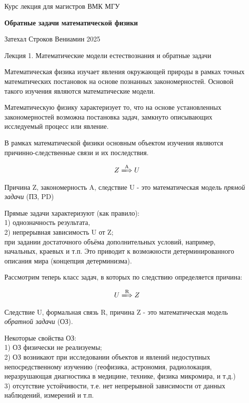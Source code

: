 \documentclass{article}
\begin{document}
\centerline{\large Курс лекция для магистров ВМК МГУ}
\centerline {\textbf{\LARGE Обратные задачи математической физики}}
\centerline {Затехал Строков Вениамин 2025}

\vspace{0.4cm}

\centerline{\LARGE Лекция 1. Математические модели естествознания и обратные задачи}

\vspace{0.5cm}

Математическая физика изучает явления окружающей природы в рамках точных математических постановок на основе познанных закономерностей.
Основой такого изучения являются математические модели.

Математическую физику характеризует то, что на основе установленных закономерностей возможна постановка задач, замкнуто описывающих исследуемый процесс или явление.

В рамках математической физики основным объектом изучения являются причинно-следственные связи и их последствия.

$$ Z \xLongrightarrow{\text{A}} U $$

Причина Z, закономерность A, следствие U - это математическая модель \textit{прямой задачи} (ПЗ, PD)

Прямые задачи характеризуют (как правило):\\
1) однозначность результата,\\
2) непрерывная зависимость U от Z;\\
при задании достаточного объёма дополнительных условий, например, начальных, краевых и т.п. Это приводит к возможности детерминированного описания мира (концепция детерминизма).

\bigskip

Рассмотрим теперь класс задач, в которых по следствию определяется причина:

$$ U \xLongrightarrow{\text{R}} Z $$

Следствие U, формальная связь R, причина Z - это математическая модель \textit{обратной задачи} (ОЗ).

Некоторые свойства ОЗ:\\
1) ОЗ физически не реализуемы;\\
2) ОЗ возникают при исследовании объектов и явлений недоступных непосредственному изучению (геофизика, астрономия, радиолокация, неразрушающая диагностика в медицине, технике, физика микромира, и т.д.)\\
3) отсутствие устойчивости, т.е. нет непрерывной зависимости от данных наблюдений, измерений и т.п.
\end{document}

